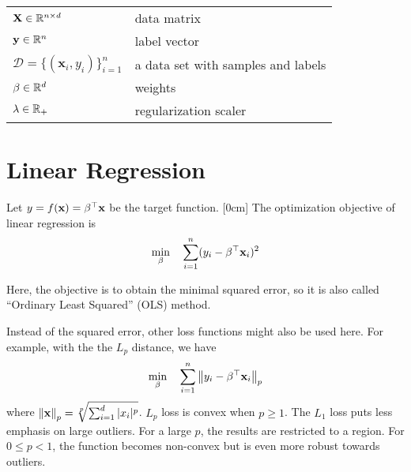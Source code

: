 \begin{tcolorbox}
\begin{tabular}{ll}
	$\mathbf{X} \in \mathbb{R}^{n \times d}$ & data matrix\\
	$\mathbf{y} \in \mathbb{R}^{n}$ & label vector\\
	$\mathcal{D} = \{(\mathbf{x}_i, y_i) \}_{i=1}^n$ & a data set with samples and labels \\
	$\beta \in \mathbb{R}^d $ & weights \\
	$\lambda \in \mathbb{R}_+$ & regularization scaler \\
\end{tabular}
\end{tcolorbox}

\section{Linear Regression}
\begin{definition}
Let $ y = f(\mathbf{x}) = \beta^\top \mathbf{x} $ be the target function.
[0cm]
The optimization objective of linear regression is 
\begin{equation}
	\min_{\beta}\quad \sum_{i=1}^n (y_i - \beta^\top \mathbf{x}_i)^2
\end{equation}
\end{definition}
Here, the objective is to obtain the minimal squared error, so it is also called ``Ordinary Least Squared'' (OLS) method.

Instead of the squared error, other loss functions might also be used here. For example, with the the $L_p$ distance, we have
\begin{equation}
	\min_{\beta}\quad \sum_{i=1}^n \left\lVert  y_i - \beta^\top \mathbf{x}_i \right\rVert_p
\end{equation}
where $\left\lVert \mathbf{x} \right\rVert_p = \sqrt[p]{\sum_{i=1}^d{|x_i|^p}} $.
$L_p$ loss is convex when $p \geq 1$.
The $L_1$ loss puts less emphasis on large outliers.
For a large $p$, the results are restricted to a region.
For $0 \leq p < 1$, the function becomes non-convex but is even more
robust towards outliers.

